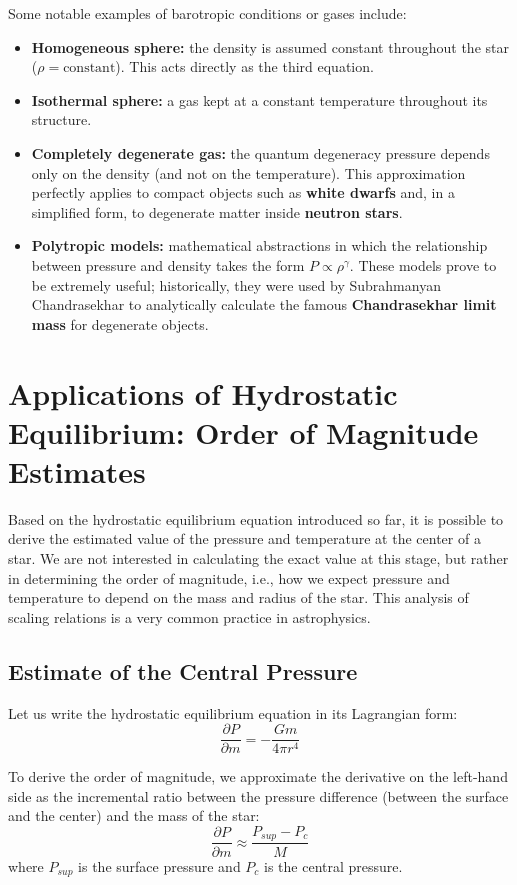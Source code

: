 Some notable examples of barotropic conditions or gases include:
\begin{itemize}
\item \textbf{Homogeneous sphere:} the density is assumed constant throughout the star ($\rho = \text{constant}$). This acts directly as the third equation.
\item \textbf{Isothermal sphere:} a gas kept at a constant temperature throughout its structure.
\item \textbf{Completely degenerate gas:} the quantum degeneracy pressure depends only on the density (and not on the temperature). This approximation perfectly applies to compact objects such as \textbf{white dwarfs} and, in a simplified form, to degenerate matter inside \textbf{neutron stars}.
\item \textbf{Polytropic models:} mathematical abstractions in which the relationship between pressure and density takes the form $P \propto \rho^\gamma$. These models prove to be extremely useful; historically, they were used by Subrahmanyan Chandrasekhar to analytically calculate the famous \textbf{Chandrasekhar limit mass} for degenerate objects.
\end{itemize}

\section{Applications of Hydrostatic Equilibrium: Order of Magnitude Estimates}

Based on the hydrostatic equilibrium equation introduced so far, it is possible to derive the estimated value of the pressure and temperature at the center of a star. We are not interested in calculating the exact value at this stage, but rather in determining the order of magnitude, i.e., how we expect pressure and temperature to depend on the mass and radius of the star. This analysis of scaling relations is a very common practice in astrophysics.

\subsection{Estimate of the Central Pressure}

Let us write the hydrostatic equilibrium equation in its Lagrangian form:
\begin{equation}
\frac{\partial P}{\partial m} = -\frac{G m}{4\pi r^4}
\end{equation}

To derive the order of magnitude, we approximate the derivative on the left-hand side as the incremental ratio between the pressure difference (between the surface and the center) and the mass of the star:
\begin{equation}
\frac{\partial P}{\partial m} \approx \frac{P_{sup} - P_c}{M}
\end{equation}
where $P_{sup}$ is the surface pressure and $P_c$ is the central pressure.

